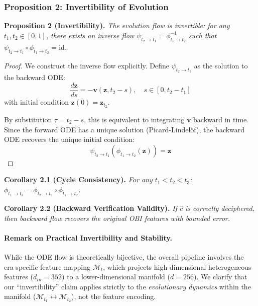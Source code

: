 \documentclass{article}
\begin{document}
\subsubsection{Proposition 2: Invertibility of Evolution}

\textbf{Proposition 2 (Invertibility).} \textit{The evolution flow is invertible: for any $t_1, t_2 \in [0, 1]$, there exists an inverse flow $\psi_{t_2 \to t_1} = \phi_{t_1 \to t_2}^{-1}$ such that $\psi_{t_2 \to t_1} \circ \phi_{t_1 \to t_2} = \text{id}$.}

\begin{proof}
We construct the inverse flow explicitly. Define $\psi_{t_2 \to t_1}$ as the solution to the backward ODE:
\begin{equation}
\frac{d\mathbf{z}}{ds} = -\mathbf{v}(\mathbf{z}, t_2 - s), \quad s \in [0, t_2 - t_1]
\end{equation}
with initial condition $\mathbf{z}(0) = \mathbf{z}_{t_2}$.

By substitution $\tau = t_2 - s$, this is equivalent to integrating $\mathbf{v}$ backward in time. Since the forward ODE has a unique solution (Picard-Lindelöf), the backward ODE recovers the unique initial condition:
\begin{equation}
\psi_{t_2 \to t_1}(\phi_{t_1 \to t_2}(\mathbf{z})) = \mathbf{z}
\end{equation}
\end{proof}

\textbf{Corollary 2.1 (Cycle Consistency).} \textit{For any $t_1 < t_2 < t_3$: $\phi_{t_1 \to t_3} = \phi_{t_2 \to t_3} \circ \phi_{t_1 \to t_2}$.}

\textbf{Corollary 2.2 (Backward Verification Validity).} \textit{If $\hat{c}$ is correctly deciphered, then backward flow recovers the original OBI features with bounded error.}

\paragraph{Remark on Practical Invertibility and Stability.}
While the ODE flow is theoretically bijective, the overall pipeline involves the era-specific feature mapping $\mathcal{M}_t$, which projects high-dimensional heterogeneous features ($d_{in}=352$) to a lower-dimensional manifold ($d=256$).
We clarify that our ``invertibility'' claim applies strictly to the \textit{evolutionary dynamics} within the manifold ($\mathcal{M}_{t_1} \leftrightarrow \mathcal{M}_{t_2}$), not the feature encoding.
\end{document}
